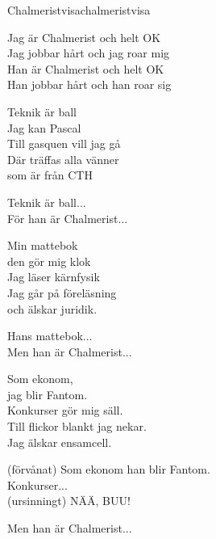 \begin{song}{Chalmeristvisa}{chalmeristvisa}

\begin{vers}
Jag är Chalmerist och helt OK \\
Jag jobbar hårt och jag roar mig\\
Han är Chalmerist och helt OK\\
Han jobbar hårt och han roar sig\\
\end{vers}
\begin{vers}
Teknik är ball \\
Jag kan Pascal\\
Till gasquen vill jag gå\\
Där träffas alla vänner\\
som är från CTH\\
\end{vers}
\begin{vers}
Teknik är ball...\\
För han är Chalmerist...\\
\end{vers}
\begin{vers}
Min mattebok \\
den gör mig klok\\
Jag läser kärnfysik\\
Jag går på föreläsning\\
och älskar juridik.\\
\end{vers}
\begin{vers}
Hans mattebok...\\
Men han är Chalmerist...\\
\end{vers}

\newp

\begin{vers}
Som ekonom,\\
jag blir Fantom.\\
Konkurser gör mig säll.\\
Till flickor blankt jag nekar.\\
Jag älskar ensamcell.\\
\end{vers}
\begin{vers}
(förvånat) Som ekonom han blir Fantom.\\
Konkurser...\\
(ursinningt) NÄÄ, BUU!\\
\end{vers}
\begin{vers}
Men han är Chalmerist...\\
\end{vers}
\end{song}
